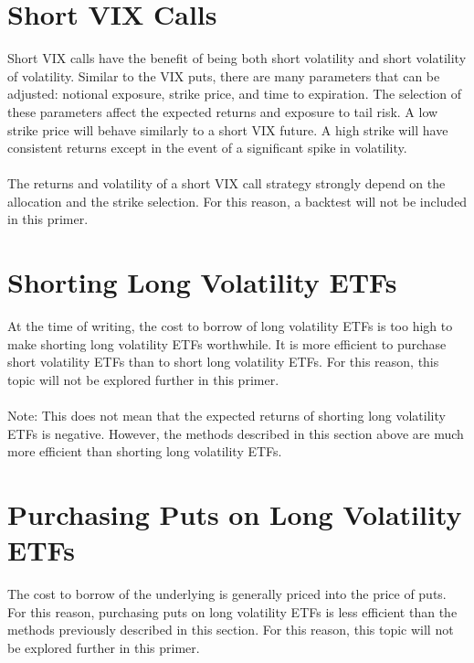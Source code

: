 \documentclass[11pt, oneside]{book}
\begin{document}
\section{Short VIX Calls} \label{Investing-ShortVIXCalls}
Short VIX calls have the benefit of being both short volatility and short volatility of volatility. Similar to the VIX puts, there are many parameters that can be adjusted: notional exposure, strike price, and time to expiration. The selection of these parameters affect the expected returns and exposure to tail risk. A low strike price will behave similarly to a short VIX future. A high strike will have consistent returns except in the event of a significant spike in volatility.\\
\\
The returns and volatility of a short VIX call strategy strongly depend on the allocation and the strike selection. For this reason, a backtest will not be included in this primer.

\section{Shorting Long Volatility ETFs} \label{Investing-ShortETF}
At the time of writing, the cost to borrow of long volatility ETFs is too high to make shorting long volatility ETFs worthwhile. It is more efficient to purchase short volatility ETFs than to short long volatility ETFs. For this reason, this topic will not be explored further in this primer.\\
\\
Note: This does not mean that the expected returns of shorting long volatility ETFs is negative. However, the methods described in this section above are much more efficient than shorting long volatility ETFs.

\section{Purchasing Puts on Long Volatility ETFs} \label{Investing-PutsETF}
The cost to borrow of the underlying is generally priced into the price of puts. For this reason, purchasing puts on long volatility ETFs is less efficient than the methods previously described in this section. For this reason, this topic will not be explored further in this primer.
\end{document}
